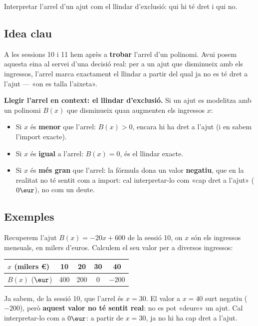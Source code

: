 %
{Interpretar l'arrel d'un ajut com el llindar d'exclusió: qui hi té dret i qui no.}

\subsection{Idea clau}

A les sessions 10 i 11 hem après a \textbf{trobar} l'arrel d'un polinomi. Avui
posem aquesta eina al servei d'una decisió real: per a un ajut que disminueix
amb els ingressos, l'arrel marca exactament el llindar a partir del qual ja
no es té dret a l'ajut — «on es talla l'aixeta».

\begin{idea}
\textbf{Llegir l'arrel en context: el llindar d'exclusió.}
Si un ajut es modelitza amb un polinomi $B(x)$ que disminueix quan
augmenten els ingressos $x$:
\begin{itemize}[leftmargin=1.4em, itemsep=2pt]
  \item Si $x$ és \textbf{menor} que l'arrel: $B(x)>0$, encara hi ha dret
        a l'ajut (i en sabem l'import exacte).
  \item Si $x$ és \textbf{igual} a l'arrel: $B(x)=0$, és el llindar exacte.
  \item Si $x$ és \textbf{més gran} que l'arrel: la fórmula dona un valor
        \textbf{negatiu}, que en la realitat no té sentit com a import: cal
        interpretar-lo com «cap dret a l'ajut» ($0\eur$), no com un deute.
\end{itemize}
\end{idea}

\subsection{Exemples}

\begin{exemple}
Recuperem l'ajut $B(x)=-20x+600$ de la sessió 10, on $x$ són els ingressos
mensuals, en milers d'euros. Calculem el seu valor per a diversos ingressos:
\begin{center}
\begin{tabular}{lcccc}
\toprule
$x$ (milers €) & 10 & 20 & 30 & 40 \\
\midrule
$B(x)$ ($\eur$) & 400 & 200 & 0 & $-200$ \\
\bottomrule
\end{tabular}
\end{center}
Ja sabem, de la sessió 10, que l'arrel és $x=30$. El valor a $x=40$ surt
negatiu ($-200$), però \textbf{aquest valor no té sentit real}: no es pot
«deure» un ajut. Cal interpretar-lo com a $0\eur$: a partir de $x=30$, ja no
hi ha cap dret a l'ajut.
\end{exemple}

